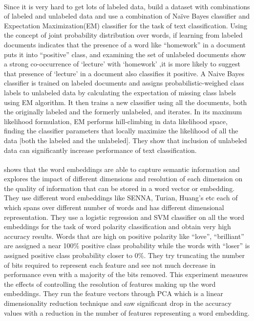 \documentclass[a4paper,26pt]{article}
\begin{document}
\paragraph{}
Since it is very hard to get lots of labeled data, \cite{nigam2000text} build a dataset with combinations of labeled and unlabeled data and use a combination of Naïve Bayes classifier and Expectation Maximization(EM) classifier for the task of text classification. Using the concept of joint probability distribution over words, if learning from labeled documents indicates that the presence of a word like ``homework'' in a document puts it into ``positive'' class, and examining the set of unlabeled documents show a strong co-occurrence of `lecture' with `homework' ,it is more likely to suggest that presence of `lecture' in a document also classifies it positive. A Naive Bayes classifier is trained on labeled documents and assigns probabilistic-weighed class labels to unlabeled data by calculating the expectation of missing class labels using EM algorithm. It then trains a new classifier using all the documents, both the originally labeled and the formerly unlabeled, and iterates. In its maximum likelihood formulation, EM performs hill-climbing in data likelihood space, finding the classifier parameters that locally maximize the likelihood of all the data |both the labeled and the unlabeled]. They show that inclusion of unlabeled data can significantly increase performance of text classification.

\paragraph{}
\cite{chen2013expressive} shows that the word embeddings are able to capture semantic information and explores the impact of different dimensions and resolution of each dimension on the quality of information that can be stored in a word vector or embedding. They use different word embeddings like SENNA, Turian, Huang's etc each of which spans over different number of words and has different dimensional representation. They use a logistic regression and SVM classifier on all the word embeddings for the task of word polarity classification and obtain very high accuracy results. Words that are high on positive polarity like ``love'', ``brilliant'' are assigned a near 100\% positive class probability while the words with ``loser'' is assigned positive class probability closer to $0\%$. They try truncating the number of bits required to represent each feature and see not much decrease in performance even with a majority of the bits removed. This experiment measures the effects of controlling the resolution of features making up the word embeddings. They run the feature vectors through PCA which is a linear dimensionality reduction technique and saw significant drop in the accuracy values with a reduction in the number of features representing a word embedding.
\end{document}
